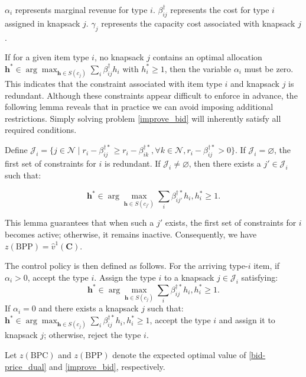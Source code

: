 $\alpha_{i}$ represents marginal revenue for type $i$. $\beta_{ij}^{\dag}$ represents the cost for type $i$ assigned in knapsack $j$. $\gamma_{j}$ represents the capacity cost associated with knapsack $j$.

If for a given item type $i$, no knapsack $j$ contains an optimal allocation $\bm{h}^{*} \in \arg\max_{\bm{h} \in S(c_j)} \sum_{i} \beta_{ij}^{\dag} h_{i}$ with $h_{i}^{*} \geq 1$, then the variable $\alpha_{i}$ must be zero. This indicates that the constraint associated with item type $i$ and knapsack $j$ is redundant. Although these constraints appear difficult to enforce in advance, the following lemma reveals that in practice we can avoid imposing additional restrictions. Simply solving problem \eqref{improve_bid} will inherently satisfy all required conditions.


\begin{lem}\label{BPP}
Define $\mathcal{J}_{i} = \{j \in \mathcal{N} \mid r_i - \beta_{ij}^{\dag *} \geq r_i - \beta_{ik}^{\dag *},\forall k \in \mathcal{N}, r_i - \beta_{ij}^{\dag *} >0 \}$.
If $\mathcal{J}_{i} = \varnothing$, the first set of constraints for $i$ is redundant.
If $\mathcal{J}_{i} \neq \varnothing$, then there exists a $j{'} \in \mathcal{J}_{i}$ such that:

$$\bm{h}^{*} \in \arg\max_{\bm{h} \in S(c_{j{'}})} \sum_{i} \beta_{ij{'}}^{\dag *} h_{i}, h_{i}^{*} \geq 1.$$
\end{lem}

This lemma guarantees that when such a $j{'}$ exists, the first set of constraints for $i$ becomes active; otherwise, it remains inactive. Consequently, we have $z(\text{BPP}) = \hat{v}^{1}(\bm{C})$.

The control policy is then defined as follows. For the arriving type-$i$ item, if $\alpha_{i} > 0$, accept the type $i$. Assign the type $i$ to a knapsack $j \in \mathcal{J}_{i}$ satisfying: $$\bm{h}^{*} \in \arg\max_{\bm{h} \in S(c_j)} \sum_{i} \beta_{ij}^{\dag *} h_{i}, h_{i}^{*} \geq 1.$$ If $\alpha_{i} = 0$ and there exists a knapsack $j$ such that: $\bm{h}^{*} \in \arg\max_{\bm{h} \in S(c_j)} \sum_{i} \beta_{ij}^{\dag *} h_{i}, h_{i}^{*} \geq 1$, accept the type $i$ and assign it to knapsack $j$; otherwise, reject the type $i$.

Let $z(\text{BPC})$ and $z(\text{BPP})$ denote the expected optimal value of \eqref{bid-price_dual} and \eqref{improve_bid}, respectively.

